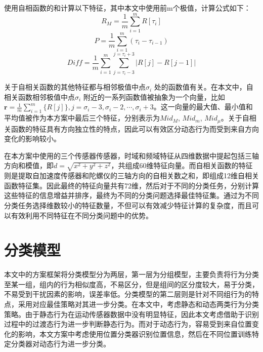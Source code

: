 \par 使用自相函数的和计算以下特征，其中本文中使用前m个极值，计算公式如下：
\begin{equation}
    R_M = \frac {1}{m}\sum_{i=1}^m R[\tau_i]
\end{equation}
\begin{equation}
    P = \frac{1}{m}\sum_{i=1}^m {(\tau_i-\tau_{i-1})}
\end{equation}
\begin{equation}
    Diff = \frac{1}{m}\sum_{i=1}^m \sum_{j=\tau_i-3}^{j=\tau_i+3} {|R[j]-R[j-1]|} 
\end{equation}
\par 关于自相关函数的其他特征都与相邻极值中点$\sigma_i$ 处的函数值有关。在本文中，自相关函数相邻极值中点$\sigma_i$ 附近的一系列函数值被抽象为一个向量，比如 $\textbf{r}=\frac {1}{m} \sum_{i=1}^m\{R[j]\}, j=\sigma_i-3, \sigma_i-2,\cdots,\sigma_i+3$。这一向量的最大值、最小值和平均值被作为本方案中最后三个特征，分别表示为$Mid_M$, $Mid_m$, $Mid_\mu$。关于自相关函数的特征具有方向独立性的特点，因此可以有效区分动态行为而受到来自方向变化的影响较小。
\par 在本方案中使用的三个传感器传感器，时域和频域特征从四维数据中提起包括三轴方向和模值，即$d=\sqrt{x^2+y^2+z^2}$，共组成60维特征向量。而自相关函数的特征则是提取自加速度传感器和陀螺仪的三轴方向的自相关数之和，即组成12维自相关函数特征集。因此最终的特征向量共有72维，然后对于不同的分类任务，分别计算这些特征的信息增益并排序，最终为不同的分类问题选择最佳特征集。通过为不同分类任务选择维数较小的特征数量，不但可以有效减少特征计算的复杂度，而且可以有效利用不同特征在不同分类问题中的优势。

\section{分类模型}
\par 本文中的方案框架将分类模型分为两层，第一层为分组模型，主要负责将行为分类至某一组，组内的行为相似度高，不易区分，但是组间的区分度较大，易于分类，不易受到干扰因素的影响，误差率低。分类模型的第二层则是针对不同组行为的特点，采用对应最佳策略对其进一步分类。在本文中，考虑静态和动态两类行为分类策略。由于静态行为在运动传感器数据中没有明显特征，因此本文考虑借助于识别过程中的过渡态行为进一步判断静态行为。而对于动态行为，容易受到来自位置变化的影响，本文方案中考虑使用位置分类器识别位置信息，然后在不同位置训练特定分类器对动态行为进一步分类。
